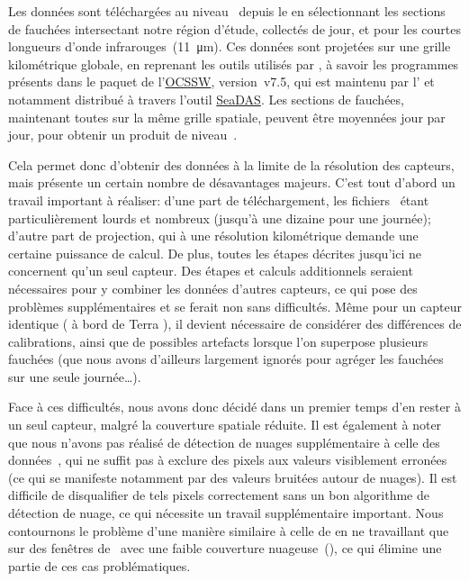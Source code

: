 Les données sont téléchargées au niveau~ depuis le  en sélectionnant les sections de fauchées\footnotemark{} intersectant notre région d'étude, collectés de jour, et pour les courtes longueurs d'onde infrarouges~(\qty{11}{\um}).
Ces données sont projetées sur une grille kilométrique globale, en reprenant les outils utilisés par \citeauthor{liu_2016}, à savoir les programmes présents dans le paquet de l'\href{https://oceandata.sci.gsfc.nasa.gov/ocssw}{OCSSW}, version~v7.5, qui est maintenu par l' et notamment distribué à travers l'outil \href{https://seadas.gsfc.nasa.gov/}{SeaDAS}.
Les sections de fauchées, maintenant toutes sur la même grille spatiale, peuvent être moyennées jour par jour, pour obtenir un produit de niveau~.

Cela permet donc d'obtenir des données à la limite de la résolution des capteurs, mais présente un certain nombre de désavantages majeurs.
C'est tout d'abord un travail important à réaliser: d'une part de téléchargement, les fichiers~ étant particulièrement lourds et nombreux (jusqu'à une dizaine pour une journée); d'autre part de projection, qui à une résolution kilométrique demande une certaine puissance de calcul.
De plus, toutes les étapes décrites jusqu'ici ne concernent qu'un seul capteur.
Des étapes et calculs additionnels seraient nécessaires pour y combiner les données d'autres capteurs, ce qui pose des problèmes supplémentaires et se ferait non sans difficultés.
Même pour un capteur identique ( à bord de Terra ), il devient nécessaire de considérer des différences de calibrations, ainsi que de possibles artefacts lorsque l'on superpose plusieurs fauchées (que nous avons d'ailleurs largement ignorés pour agréger les fauchées sur une seule journée\dots).

Face à ces difficultés, nous avons donc décidé dans un premier temps d'en rester à un seul capteur, malgré la couverture spatiale réduite.
Il est également à noter que nous n'avons pas réalisé de détection de nuages supplémentaire à celle des données~, qui ne suffit pas à exclure des pixels aux valeurs visiblement erronées (ce qui se manifeste notamment par des valeurs bruitées autour de nuages).
Il est difficile de disqualifier de tels pixels correctement sans un bon algorithme de détection de nuage, ce qui nécessite un travail supplémentaire important.
Nous contournons le problème d'une manière similaire à celle de \citeauthor{liu_2016} en ne travaillant que sur des fenêtres de~ avec une faible couverture nuageuse~(), ce qui élimine une partie de ces cas problématiques.


